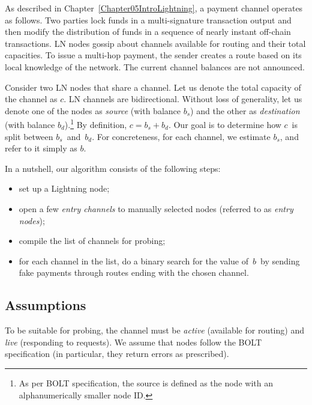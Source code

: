 As described in Chapter~\ref{Chapter05IntroLightning}, a payment channel operates as follows.
Two parties lock funds in a multi-signature transaction output and then modify the distribution of funds in a sequence of nearly instant off-chain transactions.
LN nodes gossip about channels available for routing and their total capacities.
To issue a multi-hop payment, the sender creates a route based on its local knowledge of the network.
The current channel balances are not announced.

Consider two LN nodes that share a channel.
Let us denote the total capacity of the channel as $c$.
LN channels are bidirectional.
Without loss of generality, let us denote one of the nodes as \textit{source} (with balance $b_s$) and the other as \textit{destination} (with balance $b_d$).\footnote{As per BOLT specification, the source is defined as the node with an alphanumerically smaller node ID.}
By definition, $c = b_s + b_d$.
Our goal is to determine how $c$~is split between $b_s$~and~$b_d$.
For concreteness, for each channel, we estimate $b_s$, and refer to it simply as $b$.

In a nutshell, our algorithm consists of the following steps:
\begin{itemize}
	\item set up a Lightning node;
	\item open a few \textit{entry channels} to manually selected nodes (referred to as \textit{entry nodes});
	\item compile the list of channels for probing;
	\item for each channel in the list, do a binary search for the value of~$b$~by sending fake payments through routes ending with the chosen channel.
\end{itemize}

\subsection{Assumptions}

To be suitable for probing, the channel must be \textit{active} (available for routing) and \textit{live} (responding to requests).
We assume that nodes follow the BOLT specification (in particular, they return errors as prescribed).

